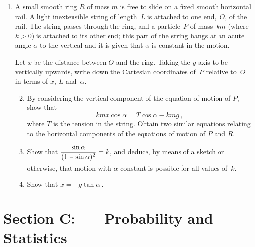 \documentclass[a4, 11pt]{report}
\newlength{\qspace}
\newcounter{qnumber}
\newenvironment{question}%
 {\vspace{\qspace}
  \begin{enumerate}[\bfseries 1\quad][10]%
    \setcounter{enumi}{\value{qnumber}}%
    \item%
 }
{
  \end{enumerate}
  \filbreak
  \stepcounter{qnumber}
 }
\newenvironment{questionparts}[1][1]%
 {
  \begin{enumerate}[\bfseries (i)]%
    \setcounter{enumii}{#1}
    \addtocounter{enumii}{-1}
    \setlength{\itemsep}{5mm}
    \setlength{\parskip}{8pt}
 }
 {
  \end{enumerate}
 }
\renewcommand{\.}[1]{\ensuremath{\mathrm{#1}}}
\newcommand{\+}[1]{\ensuremath{\mathbf{#1}}}
\begin{document}

\begin{question}
  A small smooth ring $R$ of mass $m$ is free to slide on a fixed smooth
  horizontal rail. A light inextensible string of length~$L$ is
  attached to one end,~$O$, of the rail.  The string passes through
  the ring, and a particle~$P$ of mass~$km$ (where $k>0$)
is attached to its other
  end; this part of the string hangs at an acute 
  angle $\alpha$ to the vertical and 
  it is given that $\alpha$ is constant in the motion.

  Let $x$ be the distance between $O$ and the ring.  Taking the
  $y$-axis to be vertically upwards, write down the Cartesian
  coordinates of~$P$ relative to~$O$ in terms of $x$, $L$
  and~$\alpha$.
 

\begin{questionparts}
\item
By considering the vertical component of the equation of motion of $P$,
show that
\[
km\ddot x \cos\alpha = T \cos\alpha - kmg\,,
 \]
where $T$ is the tension in the string. Obtain two similar equations
relating to the horizontal components of the equations of motion of 
$P$ and $R$.


 \item Show that
$\dfrac {\sin\alpha}{(1-\sin\alpha)^2_{\vphantom|}} = k$, and
    deduce, by means of a sketch or otherwise, that motion with $\alpha$ 
constant 
 is   possible for all values of~$k$.
\item Show that $\ddot x = -g\tan\alpha\,$.
  \end{questionparts}
\end{question}
	

	
	\newpage
\section*{Section C: \ \ \ Probability and Statistics}
\end{document}
